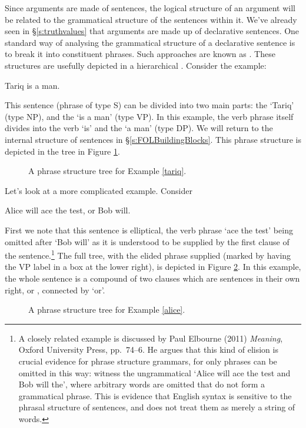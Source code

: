 Since arguments are made of sentences, the logical structure of an argument will be related to the grammatical structure of the sentences within it. We've already seen in §\ref{s:truthvalues} that arguments are made up of declarative sentences. One standard way of analysing the grammatical structure of a declarative sentence is to break it into constituent phrases. Such approaches are known as  . These structures are usefully depicted in a hierarchical . Consider the example: \begin{earg}
	\item[\ex{tariq}] Tariq is a man.
\end{earg} This sentence (phrase of type S) can be divided into two main parts: the  `Tariq' (type NP), and the  `is a man' (type VP). In this example, the verb phrase itself divides into the verb `is' and the  `a man' (type DP). We will return to the internal structure of sentences in §\ref{s:FOLBuildingBlocks}. This phrase structure is depicted in the tree in Figure \ref{fig:tariq}.
\begin{figure}
\caption{A phrase structure tree for Example \ref{tariq}. \label{fig:tariq}}
\end{figure}

Let's look at a more complicated example. Consider \begin{earg}
	\item[\ex{alice}] Alice will ace the test, or Bob will.
\end{earg} First we note that this sentence is elliptical, the verb phrase `ace the test' being omitted after `Bob will' as it is understood to be supplied by the first clause of the sentence.\footnote{A closely related example is discussed by Paul Elbourne (2011) \emph{Meaning}, Oxford University Press, pp.\ 74–6. He argues that this kind of elision is crucial evidence for phrase structure grammars, for only phrases can be omitted in this way: witness the ungrammatical `Alice will ace the test and Bob will the', where arbitrary words are omitted that do not form a grammatical phrase. This is evidence that English syntax is sensitive to the phrasal structure of sentences, and does not treat them as merely a string of words.} The full tree, with the elided phrase supplied (marked by having the VP label in a box at the lower right), is depicted in Figure \ref{fig:alice}. In this example, the whole sentence is a compound of two clauses which are sentences in their own right, or , connected by `or'.
\begin{figure}
 	\caption{A phrase structure tree for Example \ref{alice}. \label{fig:alice}}
\end{figure} 


